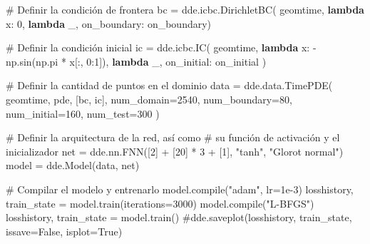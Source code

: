 \documentclass[
  spanish,
  us-letterpaper,
]{scrreprt}
\newenvironment{Shaded}{\begin{snugshade}}{\end{snugshade}}
\newcommand{\BuiltInTok}[1]{\textcolor[rgb]{0.00,0.23,0.31}{#1}}
\newcommand{\CommentTok}[1]{\textcolor[rgb]{0.37,0.37,0.37}{#1}}
\newcommand{\DecValTok}[1]{\textcolor[rgb]{0.68,0.00,0.00}{#1}}
\newcommand{\FloatTok}[1]{\textcolor[rgb]{0.68,0.00,0.00}{#1}}
\newcommand{\KeywordTok}[1]{\textcolor[rgb]{0.00,0.23,0.31}{\textbf{#1}}}
\newcommand{\NormalTok}[1]{\textcolor[rgb]{0.00,0.23,0.31}{#1}}
\newcommand{\OperatorTok}[1]{\textcolor[rgb]{0.37,0.37,0.37}{#1}}
\newcommand{\StringTok}[1]{\textcolor[rgb]{0.13,0.47,0.30}{#1}}
\theoremstyle{definition}
\theoremstyle{plain}
\theoremstyle{remark}
\begin{document}
\begin{Shaded}
\begin{Highlighting}[]
\CommentTok{\# Definir la condición de frontera}
\NormalTok{bc }\OperatorTok{=}\NormalTok{ dde.icbc.DirichletBC(}
\NormalTok{    geomtime,}
    \KeywordTok{lambda}\NormalTok{ x: }\DecValTok{0}\NormalTok{,}
    \KeywordTok{lambda}\NormalTok{ \_, on\_boundary: on\_boundary)}

\CommentTok{\# Definir la condición inicial}
\NormalTok{ic }\OperatorTok{=}\NormalTok{ dde.icbc.IC(}
\NormalTok{    geomtime,}
    \KeywordTok{lambda}\NormalTok{ x: }\OperatorTok{{-}}\NormalTok{np.sin(np.pi }\OperatorTok{*}\NormalTok{ x[:, }\DecValTok{0}\NormalTok{:}\DecValTok{1}\NormalTok{]),}
    \KeywordTok{lambda}\NormalTok{ \_, on\_initial: on\_initial}
\NormalTok{)}

\CommentTok{\# Definir la cantidad de puntos en el dominio}
\NormalTok{data }\OperatorTok{=}\NormalTok{ dde.data.TimePDE(}
\NormalTok{    geomtime, pde, [bc, ic],}
\NormalTok{    num\_domain}\OperatorTok{=}\DecValTok{2540}\NormalTok{,}
\NormalTok{    num\_boundary}\OperatorTok{=}\DecValTok{80}\NormalTok{,}
\NormalTok{    num\_initial}\OperatorTok{=}\DecValTok{160}\NormalTok{,}
\NormalTok{    num\_test}\OperatorTok{=}\DecValTok{300}
\NormalTok{)}

\CommentTok{\# Definir la arquitectura de la red, así como}
\CommentTok{\# su función de activación y el inicializador}
\NormalTok{net }\OperatorTok{=}\NormalTok{ dde.nn.FNN([}\DecValTok{2}\NormalTok{] }\OperatorTok{+}\NormalTok{ [}\DecValTok{20}\NormalTok{] }\OperatorTok{*} \DecValTok{3} \OperatorTok{+}\NormalTok{ [}\DecValTok{1}\NormalTok{], }\StringTok{"tanh"}\NormalTok{, }\StringTok{"Glorot normal"}\NormalTok{)}
\NormalTok{model }\OperatorTok{=}\NormalTok{ dde.Model(data, net)}

\CommentTok{\# Compilar el modelo y entrenarlo}
\NormalTok{model.}\BuiltInTok{compile}\NormalTok{(}\StringTok{"adam"}\NormalTok{, lr}\OperatorTok{=}\FloatTok{1e{-}3}\NormalTok{)}
\NormalTok{losshistory, train\_state }\OperatorTok{=}\NormalTok{ model.train(iterations}\OperatorTok{=}\DecValTok{3000}\NormalTok{)}
\NormalTok{model.}\BuiltInTok{compile}\NormalTok{(}\StringTok{"L{-}BFGS"}\NormalTok{)}
\NormalTok{losshistory, train\_state }\OperatorTok{=}\NormalTok{ model.train()}
\CommentTok{\#dde.saveplot(losshistory, train\_state, issave=False, isplot=True)}
\end{Highlighting}
\end{Shaded}
\end{document}
